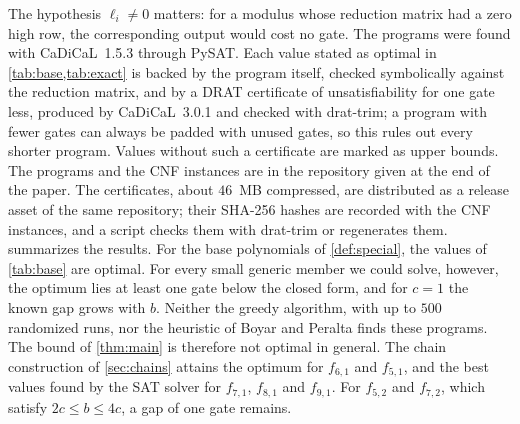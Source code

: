 \documentclass{ieeeaccess}
\theoremstyle{plain}
\theoremstyle{definition}
\begin{document}
The hypothesis $\ell_i\ne0$ matters: for a modulus whose reduction matrix had a
zero high row, the corresponding output would cost no gate.
The programs were found with CaDiCaL~1.5.3 through PySAT. Each value stated as
optimal in \cref{tab:base,tab:exact} is backed by the program itself, checked
symbolically against the reduction matrix, and by a DRAT certificate of
unsatisfiability for one gate less, produced by CaDiCaL~3.0.1 and checked with
drat-trim; a program with fewer gates can always be padded with unused gates, so
this rules out every shorter program. Values without such a certificate are
marked as upper bounds. The programs and the CNF instances are in the repository
given at the end of the paper. The certificates, about $46$~MB compressed, are
distributed as a release asset of the same repository; their SHA-256 hashes are
recorded with the CNF instances, and a script checks them with drat-trim or
regenerates them.
 summarizes the results. For the base polynomials of
\cref{def:special}, the values of \cref{tab:base} are optimal. For every small
generic member we could solve, however, the optimum lies at least one gate below
the closed form, and for $c=1$ the known gap grows with $b$. Neither the greedy algorithm,
with up to $500$ randomized runs, nor the heuristic of Boyar and Peralta finds
these programs. The bound of \cref{thm:main} is therefore not optimal in general.
The chain construction of \cref{sec:chains} attains the optimum for $f_{6,1}$
and $f_{5,1}$, and the best values found by the SAT solver for $f_{7,1}$,
$f_{8,1}$ and $f_{9,1}$. For $f_{5,2}$ and $f_{7,2}$, which satisfy $2c\le
b\le4c$, a gap of one gate remains.
\end{document}
